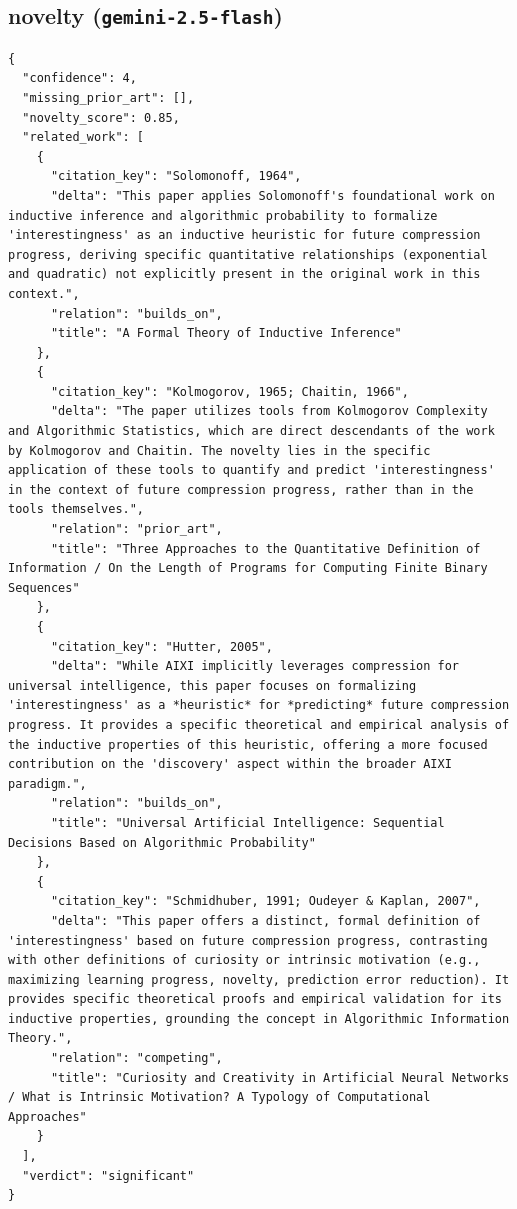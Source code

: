 \documentclass[11pt]{article}
\begin{document}
\subsection*{novelty (\texttt{gemini-2.5-flash})}
\begin{verbatim}
{
  "confidence": 4,
  "missing_prior_art": [],
  "novelty_score": 0.85,
  "related_work": [
    {
      "citation_key": "Solomonoff, 1964",
      "delta": "This paper applies Solomonoff's foundational work on inductive inference and algorithmic probability to formalize 'interestingness' as an inductive heuristic for future compression progress, deriving specific quantitative relationships (exponential and quadratic) not explicitly present in the original work in this context.",
      "relation": "builds_on",
      "title": "A Formal Theory of Inductive Inference"
    },
    {
      "citation_key": "Kolmogorov, 1965; Chaitin, 1966",
      "delta": "The paper utilizes tools from Kolmogorov Complexity and Algorithmic Statistics, which are direct descendants of the work by Kolmogorov and Chaitin. The novelty lies in the specific application of these tools to quantify and predict 'interestingness' in the context of future compression progress, rather than in the tools themselves.",
      "relation": "prior_art",
      "title": "Three Approaches to the Quantitative Definition of Information / On the Length of Programs for Computing Finite Binary Sequences"
    },
    {
      "citation_key": "Hutter, 2005",
      "delta": "While AIXI implicitly leverages compression for universal intelligence, this paper focuses on formalizing 'interestingness' as a *heuristic* for *predicting* future compression progress. It provides a specific theoretical and empirical analysis of the inductive properties of this heuristic, offering a more focused contribution on the 'discovery' aspect within the broader AIXI paradigm.",
      "relation": "builds_on",
      "title": "Universal Artificial Intelligence: Sequential Decisions Based on Algorithmic Probability"
    },
    {
      "citation_key": "Schmidhuber, 1991; Oudeyer & Kaplan, 2007",
      "delta": "This paper offers a distinct, formal definition of 'interestingness' based on future compression progress, contrasting with other definitions of curiosity or intrinsic motivation (e.g., maximizing learning progress, novelty, prediction error reduction). It provides specific theoretical proofs and empirical validation for its inductive properties, grounding the concept in Algorithmic Information Theory.",
      "relation": "competing",
      "title": "Curiosity and Creativity in Artificial Neural Networks / What is Intrinsic Motivation? A Typology of Computational Approaches"
    }
  ],
  "verdict": "significant"
}
\end{verbatim}
\end{document}
